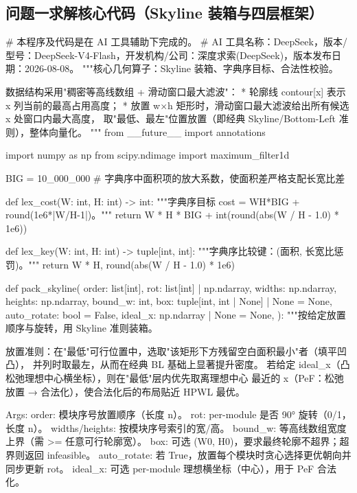 \documentclass{JXUSTmodeling}
\begin{document}
\begin{appendixx}
  \section{问题一求解核心代码（Skyline 装箱与四层框架）}
  \begin{python}
# 本程序及代码是在 AI 工具辅助下完成的。
# AI 工具名称：DeepSeek，版本/型号：DeepSeek-V4-Flash，开发机构/公司：深度求索(DeepSeek)，版本发布日期：2026-08-08。
"""核心几何算子：Skyline 装箱、字典序目标、合法性校验。

数据结构采用"稠密等高线数组 + 滑动窗口最大滤波"：
  * 轮廓线 contour[x] 表示 x 列当前的最高占用高度；
  * 放置 w×h 矩形时，滑动窗口最大滤波给出所有候选 x 处窗口内最大高度，
    取"最低、最左"位置放置（即经典 Skyline/Bottom-Left 准则），整体向量化。
"""
from __future__ import annotations

import numpy as np
from scipy.ndimage import maximum_filter1d

BIG = 10_000_000  # 字典序中面积项的放大系数，使面积差严格支配长宽比差


def lex_cost(W: int, H: int) -> int:
    """字典序目标 cost = WH*BIG + round(1e6*|W/H-1|)。"""
    return W * H * BIG + int(round(abs(W / H - 1.0) * 1e6))


def lex_key(W: int, H: int) -> tuple[int, int]:
    """字典序比较键：(面积, 长宽比惩罚)。"""
    return W * H, round(abs(W / H - 1.0) * 1e6)


def pack_skyline(
    order: list[int],
    rot: list[int] | np.ndarray,
    widths: np.ndarray,
    heights: np.ndarray,
    bound_w: int,
    box: tuple[int, int | None] | None = None,
    auto_rotate: bool = False,
    ideal_x: np.ndarray | None = None,
):
    """按给定放置顺序与旋转，用 Skyline 准则装箱。

    放置准则：在"最低"可行位置中，选取"该矩形下方残留空白面积最小"者（填平凹凸），
    并列时取最左，从而在经典 BL 基础上显著提升密度。
    若给定 ideal_x（凸松弛理想中心横坐标），则在"最低"层内优先取离理想中心
    最近的 x（PeF：松弛放置 → 合法化），使合法化后的布局贴近 HPWL 最优。

    Args:
        order: 模块序号放置顺序（长度 n）。
        rot:   per-module 是否 90° 旋转（0/1，长度 n）。
        widths/heights: 按模块序号索引的宽/高。
        bound_w: 等高线数组宽度上界（需 >= 任意可行轮廓宽）。
        box: 可选 (W0, H0)，要求最终轮廓不超界；超界则返回 infeasible。
        auto_rotate: 若 True，放置每个模块时贪心选择更优朝向并同步更新 rot。
        ideal_x: 可选 per-module 理想横坐标（中心），用于 PeF 合法化。


\end{python}
\end{appendixx}
\end{document}
